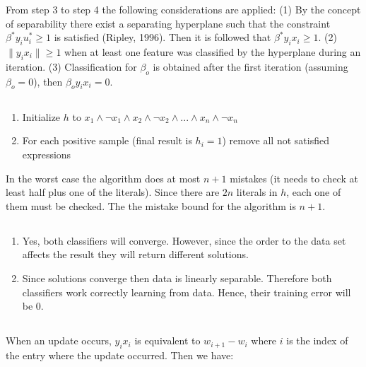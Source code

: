 \documentclass[11pt]{article}
\begin{document}
From step 3 to step 4 the following considerations are applied: (1) By the concept of separability there exist a separating hyperplane such that the constraint $\beta^*y_iu_i^* \geq 1$ is satisfied (Ripley, 1996). Then it is followed that $\beta^* y_ix_i \geq 1$. (2) $\lVert y_ix_i \rVert \geq 1$ when at least one feature was classified by the hyperplane during an iteration. (3) Classification for $\beta_o$ is obtained after the first iteration (assuming $\beta_o=0$), then $\beta_o y_ix_i = 0$.

\subsection{}

\begin{enumerate}
\item Initialize $h$ to $x_1 \wedge \neg x_1 \wedge x_2 \wedge \neg x_2 \wedge ... \wedge x_n \wedge \neg x_n$
\item For each positive sample (final result is $h_i=1$) remove all not satisfied expressions
\end{enumerate}

In the worst case the algorithm does at most $n+1$ mistakes (it needs to check at least half plus one of the literals). Since there are $2n$ literals in $h$, each one of them must be checked. The the mistake bound for the algorithm is $n+1$.


\subsection{}

\begin{enumerate}
\item Yes, both classifiers will converge. However, since the order to the data set affects the result they will return different solutions.
\item Since solutions converge then data is linearly separable. Therefore both classifiers work correctly learning from data. Hence, their training error will be 0.
\end{enumerate}


\subsection{}
When an update occurs, $y_ix_i$ is equivalent to $w_{i+1}-w_i$ where $i$ is the index of the entry where the update occurred. Then we have:
\end{document}
